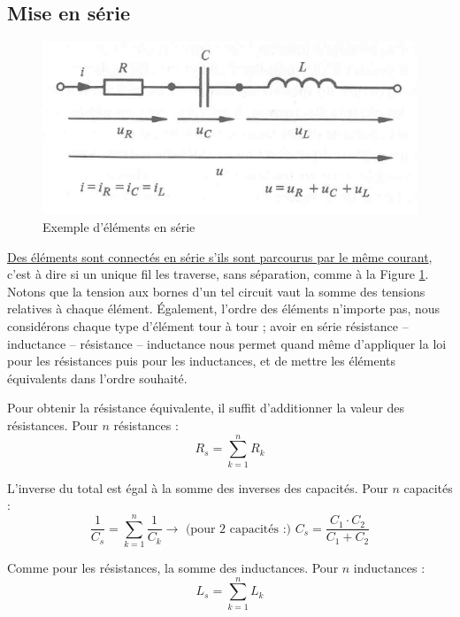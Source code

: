 \documentclass[12pt,a4paper]{article}
\begin{document}
\subsection{Mise en série}
\label{subsection: mise en serie}
\begin{figure}
	\centering
	\includegraphics[scale=0.5]{images/mise_serie}
	\caption{Exemple d'éléments en série}
	\label{fig: mise en serie}
\end{figure}
\uline{Des éléments sont connectés en série s'ils sont parcourus par le même courant}, c'est à dire si un unique fil les traverse, sans séparation, comme à la Figure \ref{fig: mise en serie}. Notons que la tension aux bornes d'un tel circuit vaut la somme des tensions relatives à chaque élément. Également, l'ordre des éléments n'importe pas, nous considérons chaque type d'élément tour à tour ; avoir en série résistance -- inductance -- résistance -- inductance nous permet quand même d'appliquer la loi pour les résistances puis pour les inductances, et de mettre les éléments équivalents dans l'ordre souhaité.
\begin{boite}
	 Pour obtenir la résistance équivalente, il suffit d'additionner la valeur des résistances. Pour $n$ résistances :
	\begin{equation}	
		R_{s} = \sum_{k=1}^n R_k
	\end{equation}
\end{boite}
\begin{boite}
	 L'inverse du total est égal à la somme des inverses des capacités. Pour $n$ capacités :
	\begin{equation}
		\frac{1}{C_{s}} = \sum_{k=1}^n \frac{1}{C_k} \to \text{ (pour 2 capacités :) } C_{s} = \frac{C_1 \cdot C_2}{C_1 + C_2}
	\end{equation}		
\end{boite}
\begin{boite}
	 Comme pour les résistances, la somme des inductances. Pour $n$ inductances :
	\begin{equation}
		L_{s} = \sum_{k=1}^n L_k	
	\end{equation}		
\end{boite}
\end{document}
